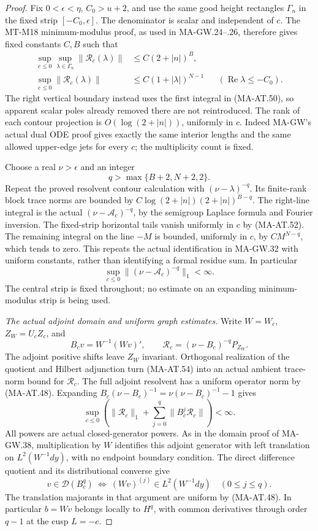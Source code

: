 \begin{proof}
Fix \(0<\epsilon<\eta\), \(C_0>u+2\), and use the same good
height rectangles \(\Gamma_n\) in the fixed strip
\([-C_0,\epsilon]\).  The denominator is scalar and independent
of \(c\).  The MT-M18 minimum-modulus proof, as used in
MA-GW.24--.26, therefore gives fixed constants \(C,B\) such that
\[
 \begin{aligned}
 \sup_{c\le0}\sup_{\lambda\in\Gamma_n}
             \|\mathscr R_c(\lambda)\|
       &\le C(2+|n|)^B,\\
 \sup_{c\le0}\|\mathscr R_c(\lambda)\|
       &\le C(1+|\lambda|)^{N-1}
                         &&(\operatorname{Re}\lambda\le-C_0).
 \end{aligned}
 \tag{MA-AT.52}
\]
The right vertical boundary instead uses the first integral
in (MA-AT.50), so apparent scalar poles already removed there
are not reintroduced.
The rank of each contour projection is
\(O(\log(2+|n|))\), uniformly in \(c\).
Indeed MA-GW's actual dual ODE proof gives exactly the same
interior lengths and the same allowed upper-edge jets for
every \(c\); the multiplicity count is fixed.

Choose a real \(\nu>\epsilon\) and an integer
\[
                         q>\max\{B+2,N+2,2\}.
 \tag{MA-AT.53}
\]
Repeat the proved resolvent contour calculation with
\((\nu-\lambda)^{-q}\).
Its finite-rank block trace norms are bounded by
\(C\log(2+|n|)(2+|n|)^{B-q}\).
The right-line integral is the actual
\((\nu-\mathscr A_c)^{-q}\), by the semigroup Laplace
formula and Fourier inversion.
The fixed-strip horizontal tails vanish uniformly in \(c\)
by (MA-AT.52).
The remaining integral on the line \(-M\) is bounded,
uniformly in \(c\), by \(CM^{N-q}\), which tends to zero.
This repeats the actual identification in MA-GW.32 with
uniform constants, rather than identifying a formal
residue sum.  In particular
\[
              \sup_{c\le0}\|(\nu-\mathscr A_c)^{-q}\|_1<\infty .
 \tag{MA-AT.54}
\]
The central strip is fixed throughout; no estimate on an
expanding minimum-modulus strip is being used.

\emph{The actual adjoint domain and uniform graph estimates.}
Write \(W=W_c\), \(Z_W=U_cZ_c\), and
\[
 B_cv=W^{-1}(Wv)',\qquad
 \mathcal R_c=(\nu-B_c)^{-q}P_{Z_W}.
 \tag{MA-AT.55}
\]
The adjoint positive shifts leave \(Z_W\) invariant.
Orthogonal realization of the quotient and Hilbert adjunction
turn (MA-AT.54) into an actual ambient trace-norm bound for
\(\mathcal R_c\).
The full adjoint resolvent has a uniform operator norm by
(MA-AT.48).  Expanding
\(B_c(\nu-B_c)^{-1}=\nu(\nu-B_c)^{-1}-1\) gives
\[
 \sup_{c\le0}
     \left(\|\mathcal R_c\|_1+
                 \sum_{j=0}^q\|B_c^j\mathcal R_c\|\right)<\infty .
 \tag{MA-AT.56}
\]
All powers are actual closed-generator powers.
As in the domain proof of MA-GW.38, multiplication by \(W\)
identifies this adjoint generator with left translation on
\(L^2(W^{-1}dy)\), with no endpoint boundary condition.
The direct difference quotient and its distributional converse
give
\[
 v\in\mathcal D(B_c^q)
 \ \Longleftrightarrow\
 (Wv)^{(j)}\in L^2(W^{-1}dy)\quad(0\le j\le q).
 \tag{MA-AT.57}
\]
The translation majorants in that argument are uniform by
(MA-AT.48).  In particular \(b=Wv\) belongs locally to
\(H^q\), with common derivatives through order \(q-1\)
at the cusp \(L=-c\).


\end{proof}
